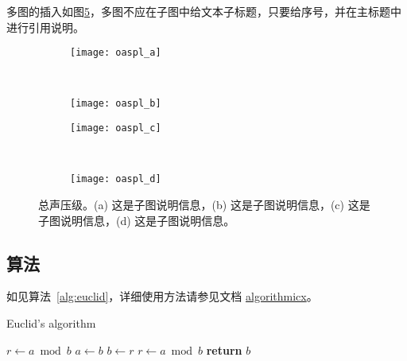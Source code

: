 多图的插入如图\ref{fig:oaspl}，多图不应在子图中给文本子标题，只要给序号，并在主标题中进行引用说明。
\begin{figure}[!htbp]
    \centering
    \begin{subfigure}[b]{0.35\textwidth}
      \texttt{[image: oaspl\_a]}
      \caption{}
      \label{fig:oaspl_a}
    \end{subfigure}%
    ~%
    \begin{subfigure}[b]{0.35\textwidth}
      \texttt{[image: oaspl\_b]}
      \caption{}
      \label{fig:oaspl_b}
    \end{subfigure}
    \begin{subfigure}[b]{0.35\textwidth}
      \texttt{[image: oaspl\_c]}
      \caption{}
      \label{fig:oaspl_c}
    \end{subfigure}%
    ~%
    \begin{subfigure}[b]{0.35\textwidth}
      \texttt{[image: oaspl\_d]}
      \caption{}
      \label{fig:oaspl_d}
    \end{subfigure}
    \caption{总声压级。(a) 这是子图说明信息，(b) 这是子图说明信息，(c) 这是子图说明信息，(d) 这是子图说明信息。}
    \label{fig:oaspl}
\end{figure}

\subsection{算法}

如见算法~\ref{alg:euclid}，详细使用方法请参见文档 \href{https://ctan.org/pkg/algorithmicx?lang=en}{algorithmicx}。

\begin{algorithm}[!htbp]
    \small
    \caption{Euclid's algorithm}\label{alg:euclid}
    \begin{algorithmic}[1]
        \State $r\gets a\bmod b$
        \State $a\gets b$
        \State $b\gets r$
        \State $r\gets a\bmod b$
        \EndWhile\label{euclidendwhile}
        \State \textbf{return} $b$
        \EndProcedure
    \end{algorithmic}
\end{algorithm}

